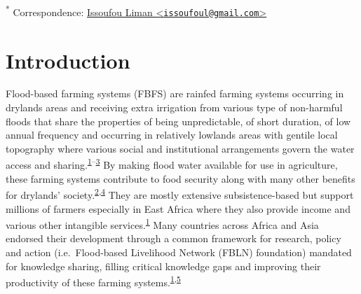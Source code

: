 \documentclass[12pt,oneside]{article}
\begin{document}
\textsuperscript{*} Correspondence:
\href{mailto:issoufoul@gmail.com}{Issoufou Liman
\textless{}\href{mailto:issoufoul@gmail.com}{\nolinkurl{issoufoul@gmail.com}}\textgreater{}}

\hypertarget{intro}{%
\section{Introduction}\label{intro}}

Flood-based farming systems (FBFS) are rainfed farming systems occurring
in drylands areas and receiving extra irrigation from various type of
non-harmful floods that share the properties of being unpredictable, of
short duration, of low annual frequency and occurring in relatively
lowlands areas with gentile local topography where various social and
institutional arrangements govern the water access and
sharing.\textsuperscript{\protect\hyperlink{ref-Puertas_et_al_2011}{1}--\protect\hyperlink{ref-Varisco_1983}{3}}
By making flood water available for use in agriculture, these farming
systems contribute to food security along with many other benefits for
drylands'
society.\textsuperscript{\protect\hyperlink{ref-VanSteenbergen_et_al_2010}{2},\protect\hyperlink{ref-Xing_et_al_2014}{4}}
They are mostly extensive subsistence-based but support millions of
farmers especially in East Africa where they also provide income and
various other intangible
services.\textsuperscript{\protect\hyperlink{ref-Puertas_et_al_2011}{1}}
Many countries across Africa and Asia endorsed their development through
a common framework for research, policy and action (i.e.~Flood-based
Livelihood Network (FBLN) foundation) mandated for knowledge sharing,
filling critical knowledge gaps and improving their productivity of
these farming
systems.\textsuperscript{\protect\hyperlink{ref-Puertas_et_al_2011}{1},\protect\hyperlink{ref-FBLN_2018}{5}}
\end{document}
